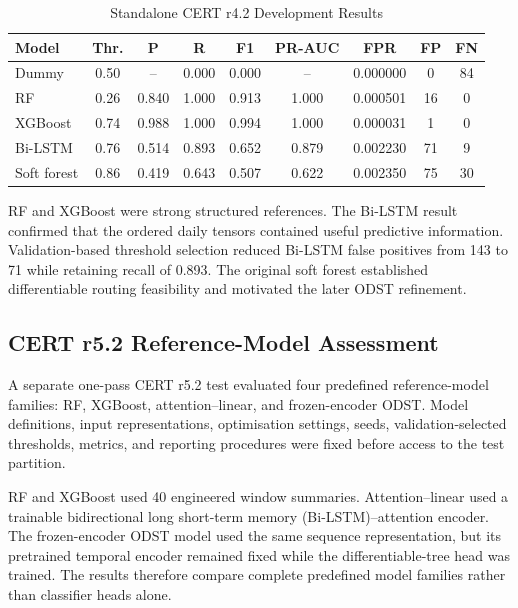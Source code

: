 \begin{table}[!tbp]
\caption{Standalone CERT r4.2 Development Results}
\label{tab:standalone_baselines}
\centering
\footnotesize
\renewcommand{\arraystretch}{1.08}
\setlength{\tabcolsep}{0pt}
\begin{tabular*}{\columnwidth}
{@{\extracolsep{\fill}}lcccccccc@{}}
\hline
\textbf{Model} &
\textbf{Thr.} &
\textbf{P} &
\textbf{R} &
\textbf{F1} &
\textbf{PR-AUC} &
\textbf{FPR} &
\textbf{FP} &
\textbf{FN} \\
\hline
Dummy &
0.50 & -- & 0.000 & 0.000 & -- & 0.000000 & 0 & 84 \\
RF &
0.26 & 0.840 & 1.000 & 0.913 & 1.000 & 0.000501 & 16 & 0 \\
XGBoost &
0.74 & 0.988 & 1.000 & 0.994 & 1.000 & 0.000031 & 1 & 0 \\
Bi-LSTM &
0.76 & 0.514 & 0.893 & 0.652 & 0.879 & 0.002230 & 71 & 9 \\
Soft forest &
0.86 & 0.419 & 0.643 & 0.507 & 0.622 & 0.002350 & 75 & 30 \\
\hline
\end{tabular*}
\end{table}

RF and XGBoost were strong structured references. The Bi-LSTM result
confirmed that the ordered daily tensors contained useful predictive
information. Validation-based threshold selection reduced Bi-LSTM false
positives from 143 to 71 while retaining recall of 0.893. The original soft
forest established differentiable routing feasibility and motivated the
later ODST refinement.

\subsection{CERT r5.2 Reference-Model Assessment}
\label{subsec:r52_reference_results}
A separate one-pass CERT r5.2 test evaluated four predefined reference-model
families: RF, XGBoost, attention--linear, and frozen-encoder ODST. Model
definitions, input representations, optimisation settings, seeds,
validation-selected thresholds, metrics, and reporting procedures were
fixed before access to the test partition.

\smallskip
RF and XGBoost used 40 engineered window summaries. Attention--linear used
a trainable bidirectional long short-term memory
(Bi-LSTM)--attention encoder. The frozen-encoder ODST model used the same
sequence representation, but its pretrained temporal encoder remained fixed
while the differentiable-tree head was trained. The results therefore
compare complete predefined model families rather than classifier heads
alone.

